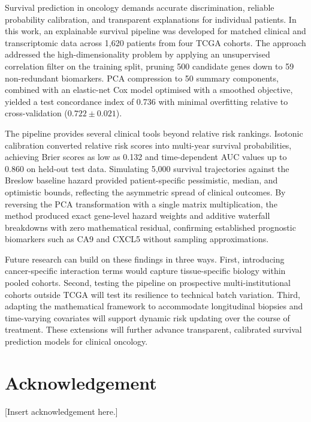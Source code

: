 \documentclass[10pt,a4paper]{article}
\begin{document}
Survival prediction in oncology demands accurate discrimination, reliable probability calibration, and transparent explanations for individual patients. In this work, an explainable survival pipeline was developed for matched clinical and transcriptomic data across 1,620 patients from four TCGA cohorts. The approach addressed the high-dimensionality problem by applying an unsupervised correlation filter on the training split, pruning 500 candidate genes down to 59 non-redundant biomarkers. PCA compression to 50 summary components, combined with an elastic-net Cox model optimised with a smoothed objective, yielded a test concordance index of 0.736 with minimal overfitting relative to cross-validation ($0.722 \pm 0.021$).

The pipeline provides several clinical tools beyond relative risk rankings. Isotonic calibration converted relative risk scores into multi-year survival probabilities, achieving Brier scores as low as 0.132 and time-dependent AUC values up to 0.860 on held-out test data. Simulating 5,000 survival trajectories against the Breslow baseline hazard provided patient-specific pessimistic, median, and optimistic bounds, reflecting the asymmetric spread of clinical outcomes. By reversing the PCA transformation with a single matrix multiplication, the method produced exact gene-level hazard weights and additive waterfall breakdowns with zero mathematical residual, confirming established prognostic biomarkers such as CA9 and CXCL5 without sampling approximations.

Future research can build on these findings in three ways. First, introducing cancer-specific interaction terms would capture tissue-specific biology within pooled cohorts. Second, testing the pipeline on prospective multi-institutional cohorts outside TCGA will test its resilience to technical batch variation. Third, adapting the mathematical framework to accommodate longitudinal biopsies and time-varying covariates will support dynamic risk updating over the course of treatment. These extensions will further advance transparent, calibrated survival prediction models for clinical oncology.

\section*{Acknowledgement}

[Insert acknowledgement here.]

\vspace{1em}


\end{document}
